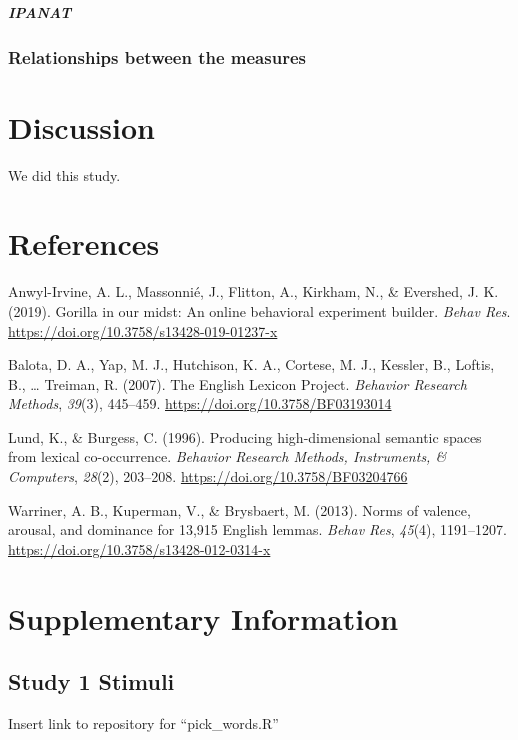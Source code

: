 \documentclass[man]{apa6}
\let\oldsubparagraph\subparagraph
\renewcommand{\subparagraph}[1]{\oldsubparagraph{#1}\mbox{}}
\begin{document}
\hypertarget{ipanat-4}{%
\subparagraph{IPANAT}\label{ipanat-4}}

\hypertarget{relationships-between-the-measures}{%
\subsubsection{Relationships between the measures}\label{relationships-between-the-measures}}

\hypertarget{discussion}{%
\section{Discussion}\label{discussion}}

We did this study.

\newpage

\hypertarget{references}{%
\section{References}\label{references}}

\begingroup
\setlength{\parindent}{-0.5in}
\setlength{\leftskip}{0.5in}

\hypertarget{refs}{}
\leavevmode\hypertarget{ref-anwyl-irvine_gorilla_2019}{}%
Anwyl-Irvine, A. L., Massonnié, J., Flitton, A., Kirkham, N., \& Evershed, J. K. (2019). Gorilla in our midst: An online behavioral experiment builder. \emph{Behav Res}. \url{https://doi.org/10.3758/s13428-019-01237-x}

\leavevmode\hypertarget{ref-balota_english_2007}{}%
Balota, D. A., Yap, M. J., Hutchison, K. A., Cortese, M. J., Kessler, B., Loftis, B., \ldots{} Treiman, R. (2007). The English Lexicon Project. \emph{Behavior Research Methods}, \emph{39}(3), 445--459. \url{https://doi.org/10.3758/BF03193014}

\leavevmode\hypertarget{ref-lund_producing_1996}{}%
Lund, K., \& Burgess, C. (1996). Producing high-dimensional semantic spaces from lexical co-occurrence. \emph{Behavior Research Methods, Instruments, \& Computers}, \emph{28}(2), 203--208. \url{https://doi.org/10.3758/BF03204766}

\leavevmode\hypertarget{ref-warriner_norms_2013}{}%
Warriner, A. B., Kuperman, V., \& Brysbaert, M. (2013). Norms of valence, arousal, and dominance for 13,915 English lemmas. \emph{Behav Res}, \emph{45}(4), 1191--1207. \url{https://doi.org/10.3758/s13428-012-0314-x}

\endgroup

\newpage

\hypertarget{supplementary-information}{%
\section{Supplementary Information}\label{supplementary-information}}

\hypertarget{study-1-stimuli}{%
\subsection{Study 1 Stimuli}\label{study-1-stimuli}}

Insert link to repository for \enquote{pick\_words.R}
\end{document}
